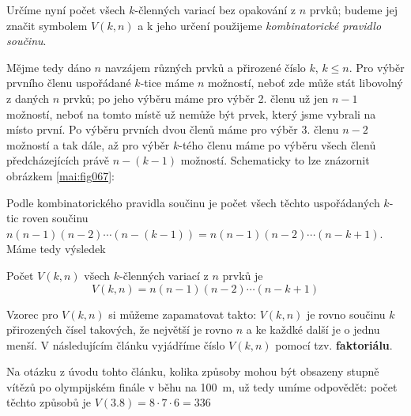     Určíme nyní počet všech \(k\)-členných variací bez opakování z \(n\) prvků; budeme jej značit
    symbolem \(V(k,n)\) a k jeho určení použijeme \emph{kombinatorické pravidlo součinu}.

    Mějme tedy dáno \(n\) navzájem různých prvků a přirozené číslo \(k\), \(k\leq n\). Pro výběr
    prvního členu uspořádané \(k\)-tice máme \(n\) možností, neboť zde může stát libovolný z daných
    \(n\) prvků; po jeho výběru máme pro výběr 2. členu už jen \(n - 1\) možností, neboť na tomto
    místě už nemůže být prvek, který jsme vybrali na místo první. Po výběru prvních dvou členů máme
    pro výběr 3. členu \(n - 2\) možností a tak dále, až pro výběr \(k\)-tého členu máme po výběru
    všech členů předcházejících právě \(n - (k - 1)\) možností. Schematicky to lze znázornit
    obrázkem \ref{mai:fig067}:


    Podle kombinatorického pravidla součinu je počet všech těchto uspořádaných \(k\)-tic roven
    součinu \(n(n-1)(n-2)\cdots(n-(k-1)) = n(n-1)(n-2)\cdots(n - k + 1)\). Máme tedy výsledek

    \begin{mdframed}[style=highlight] Počet \(V(k,n)\) všech \(k\)-členných variací z \(n\) prvků je
      \begin{equation*}
        V(k,n) = n(n-1)(n-2)\cdots(n - k + 1)
      \end{equation*}
    \end{mdframed} 

    Vzorec pro \(V(k,n)\) si můžeme zapamatovat takto: \(V(k,n)\) je rovno součinu \(k\) přirozených
    čísel takových, že největší je rovno \(n\) a ke každké další je o jednu menší. V následujícím
    článku vyjádříme číslo \(V(k,n)\) pomocí tzv. \textbf{faktoriálu}. 

    Na otázku z úvodu tohto článku, kolika způsoby mohou být obsazeny stupně vítězů po olympijském
    finále v běhu na \SI{100}{\meter}, už tedy umíme odpovědět: počet těchto způsobů je \(V(3.8) =
    8\cdot7\cdot6=336\)

    
  
